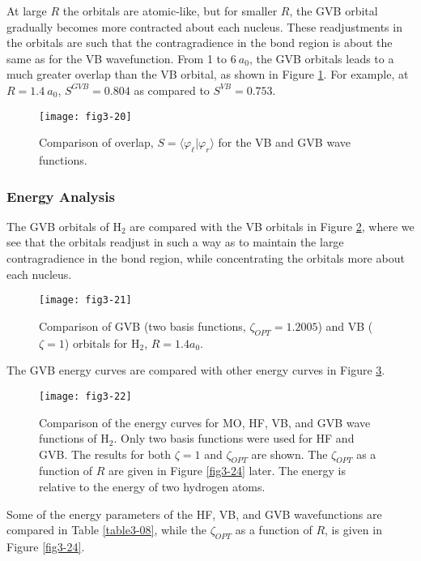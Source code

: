At large $R$ the orbitals are atomic-like, but for smaller $R$, the
GVB orbital gradually becomes more contracted about each nucleus.
These readjustments in the orbitals are such that the contragradience
in the bond region is about the same as for the VB
wavefunction.  From 1 to $6\ a_0$, the GVB orbitals leads to a much
greater overlap than the VB orbital, as shown in Figure
\ref{fig3-21}.  For example, at $R = 1.4\ a_0$, $S^{GVB} = 0.804$ as
compared to $S^{VB} = 0.753$.

\begin{figure}
\texttt{[image: fig3-20]}
\caption{Comparison of overlap, $S = \langle \varphi_\ell 
\vert \varphi_r \rangle$ for the VB and GVB wave functions.}
\label{fig3-21}
\end{figure}

\subsubsection{Energy Analysis}

The GVB orbitals of H$_2$ are compared with the
VB orbitals in Figure \ref{fig3-22}, where we see that the
orbitals readjust in such a way as to maintain the large
contragradience in the bond region, while concentrating the orbitals
more about each nucleus.

\begin{figure}
\texttt{[image: fig3-21]}
\caption{Comparison of GVB (two basis functions, $\zeta_{OPT} =
1.2005$) and VB ($\zeta = 1$) orbitals for H$_2$, $R = 1.4a_0$.}
\label{fig3-22}
\end{figure}

The GVB energy curves are compared with other
energy curves in Figure \ref{fig3-23}.

\begin{figure}
\texttt{[image: fig3-22]}
\caption{Comparison of the energy curves for MO, HF, VB, and GVB
wave functions of H$_2$. Only two basis functions were used for HF and
GVB. The results for both $\zeta = 1$ and  
$\zeta_{OPT}$ are shown.  The $\zeta_{OPT}$ as a function of $R$ are given 
in Figure \ref{fig3-24} later. The energy is relative to the energy
of two hydrogen atoms.}
\label{fig3-23}
\end{figure}

Some of the energy parameters of the HF, VB, and
GVB wavefunctions are compared in Table
\ref{table3-08}, while the $\zeta_{OPT}$ as a function of $R$, is
given in Figure \ref{fig3-24}.


